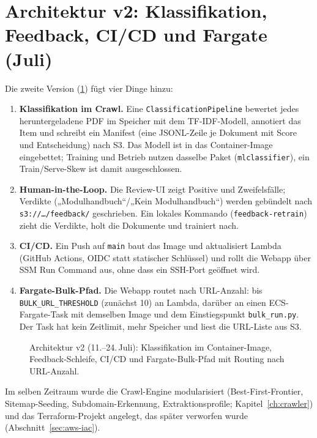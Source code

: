 \section{Architektur v2: Klassifikation, Feedback, CI/CD und Fargate (Juli)}\label{sec:arch-v2}
Die zweite Version (\cref{fig:archB}) fügt vier Dinge hinzu:
\begin{enumerate}
  \item \textbf{Klassifikation im Crawl.} Eine \texttt{ClassificationPipeline} bewertet jedes heruntergeladene PDF im Speicher mit dem TF-IDF-Modell, annotiert das Item und schreibt ein Manifest (eine JSONL-Zeile je Dokument mit Score und Entscheidung) nach S3. Das Modell ist in das Container-Image eingebettet; Training und Betrieb nutzen dasselbe Paket (\texttt{mlclassifier}), ein Train/Serve-Skew ist damit ausgeschlossen.
  \item \textbf{Human-in-the-Loop.} Die Review-UI zeigt Positive und Zweifelsfälle; Verdikte („Modulhandbuch“/„Kein Modulhandbuch“) werden gebündelt nach \texttt{s3://…/feedback/} geschrieben. Ein lokales Kommando (\texttt{feedback-retrain}) zieht die Verdikte, holt die Dokumente und trainiert nach.
  \item \textbf{CI/CD.} Ein Push auf \texttt{main} baut das Image und aktualisiert Lambda (GitHub Actions, OIDC statt statischer Schlüssel) und rollt die Webapp über SSM Run Command aus, ohne dass ein SSH-Port geöffnet wird.
  \item \textbf{Fargate-Bulk-Pfad.} Die Webapp routet nach URL-Anzahl: bis \texttt{BULK\_URL\_THRESHOLD} (zunächst 10) an Lambda, darüber an einen ECS-Fargate-Task mit demselben Image und dem Einstiegspunkt \texttt{bulk\_run.py}. Der Task hat kein Zeitlimit, mehr Speicher und liest die URL-Liste aus S3.
\end{enumerate}

\begin{figure}\centering
  \resizebox{0.95\linewidth}{!}{\archB}
  \caption{Architektur v2 (11.--24.\,Juli): Klassifikation im Container-Image, Feedback-Schleife, CI/CD und Fargate-Bulk-Pfad mit Routing nach URL-Anzahl.}\label{fig:archB}
\end{figure}

Im selben Zeitraum wurde die Crawl-Engine modularisiert (Best-First-Frontier, Sitemap-Seeding, Subdomain-Erkennung, Extraktionsprofile; Kapitel~\ref{ch:crawler}) und das Terraform-Projekt angelegt, das später verworfen wurde (Abschnitt~\ref{sec:aws-iac}).

